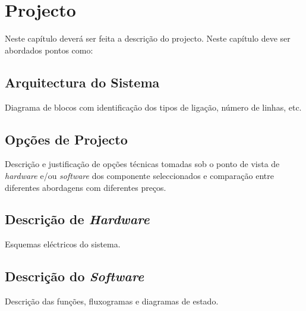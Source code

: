 \chapter{Projecto}
Neste capítulo deverá ser feita a descrição do projecto. Neste capítulo deve ser abordados pontos como:

\section{Arquitectura do Sistema}
Diagrama de blocos com identificação dos tipos de ligação, número de linhas, etc.

\section{Opções de Projecto}
Descrição e justificação de opções técnicas tomadas sob o ponto de vista de \textit{hardware} e/ou \textit{software} dos componente seleccionados e comparação entre diferentes abordagens com diferentes preços.

\section{Descrição de \textit{Hardware}}
Esquemas eléctricos do sistema.

\section{Descrição do \textit{Software}}
Descrição das funções, fluxogramas e diagramas de estado.